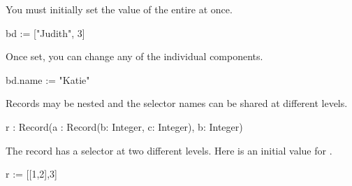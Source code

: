 \begin{xtc}
\begin{xtccomment}
You must initially set the value of the entire 
at once.
\end{xtccomment}
\begin{spadsrc}
bd := ["Judith", 3] 
\end{spadsrc}
\begin{TeXOutput}
\begin{fricasmath}{9}
%
\end{fricasmath}
\end{TeXOutput}
\end{xtc}
\begin{xtc}
\begin{xtccomment}
Once set, you can change any of the individual components.
\end{xtccomment}
\begin{spadsrc}
bd.name := "Katie" 
\end{spadsrc}
\begin{TeXOutput}
\begin{fricasmath}{10}
%
\end{fricasmath}
\end{TeXOutput}
\end{xtc}
\begin{xtc}
\begin{xtccomment}
Records may be nested and the selector names can be shared at
different levels.
\end{xtccomment}
\begin{spadsrc}
r : Record(a : Record(b: Integer, c: Integer), b: Integer) 
\end{spadsrc}
\end{xtc}
\begin{xtc}
\begin{xtccomment}
The record  has a  selector at two different levels.
Here is an initial value for .
\end{xtccomment}
\begin{spadsrc}
r := [[1,2],3] 
\end{spadsrc}
\begin{TeXOutput}
\begin{fricasmath}{12}
%
\end{fricasmath}
\end{TeXOutput}
\end{xtc}
